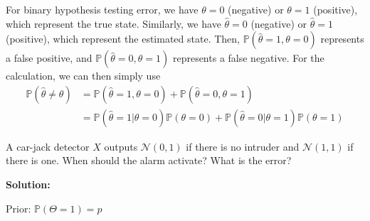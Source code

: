 For binary hypothesis testing error, we have \(\theta = 0\) (negative) or \(\theta = 1\) (positive), which represent the true state. Similarly, we have \(\hat{\theta} = 0\) (negative) or \(\hat{\theta} = 1\) (positive), which represent the estimated state. Then, \(\mathbb{P}(\hat{\theta} = 1, \theta = 0)\) represents a false positive, and \(\mathbb{P}(\hat{\theta} = 0, \theta = 1)\) represents a false negative. For the calculation, we can then simply use 
\[
\begin{aligned}
  \mathbb{P} (\hat{\theta} \neq \theta) &= \mathbb{P}(\hat{\theta} = 1, \theta = 0) + \mathbb{P}(\hat{\theta} = 0, \theta = 1) \\ 
  &= \mathbb{P}(\hat{\theta} = 1 \vert \theta = 0)\mathbb{P}(\theta = 0) + \mathbb{P}(\hat{\theta} = 0 \vert \theta = 1)\mathbb{P}(\theta = 1)
\end{aligned}
\]

\begin{eg}
  A car-jack detector \(X\) outputs \(\mathcal{N}(0, 1)\) if there is no intruder and \(\mathcal{N}(1, 1)\) if there is one. When should the alarm activate? What is the error?

  \textbf{Solution:} 

  Prior: \(\mathbb{P} (\Theta = 1) = p\) 
\end{eg}


